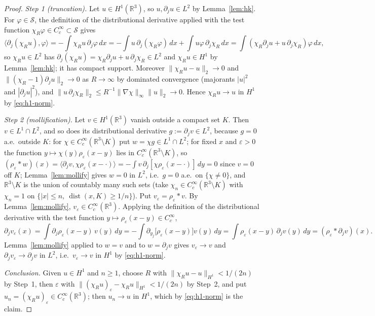 \documentclass[11pt]{article}
\theoremstyle{definition}
\theoremstyle{plain}
\newcommand{\R}{\mathbb R}
\begin{document}
\begin{proof}
\emph{Step 1 (truncation).}  Let $u\in H^1(\R^3)$, so $u,\partial_ju\in L^2$
by Lemma~\ref{lem:hk}.  For $\varphi\in\mathcal S$, the definition of the
distributional derivative applied with the test function
$\chi_R\varphi\in C_c^\infty\subset\mathcal S$ gives
\[
 \langle\partial_j(\chi_Ru),\varphi\rangle=-\int\chi_Ru\,\partial_j\varphi\,dx
 =-\int u\,\partial_j(\chi_R\varphi)\,dx+\int u\varphi\,\partial_j\chi_R\,dx
 =\int(\chi_R\partial_ju+u\,\partial_j\chi_R)\varphi\,dx,
\]
so $\chi_Ru\in L^2$ has $\partial_j(\chi_Ru)=\chi_R\partial_ju+u\,\partial_j\chi_R\in L^2$
and $\chi_Ru\in H^1$ by Lemma~\ref{lem:hk}; it has compact support.
Moreover $\|\chi_Ru-u\|_2\to0$ and $\|(\chi_R-1)\partial_ju\|_2\to0$ as
$R\to\infty$ by dominated convergence (majorants $|u|^2$ and
$|\partial_ju|^2$), and
$\|u\,\partial_j\chi_R\|_2\le R^{-1}\|\nabla\chi\|_\infty\|u\|_2\to0$.
Hence $\chi_Ru\to u$ in $H^1$ by \eqref{eq:h1-norm}.

\emph{Step 2 (mollification).}  Let $v\in H^1(\R^3)$ vanish outside a
compact set $K$.  Then $v\in L^1\cap L^2$, and so does its distributional
derivative $g:=\partial_jv\in L^2$, because $g=0$ a.e.\ outside $K$: for
$\chi\in C_c^\infty(\R^3\setminus K)$ put $w=\chi g\in L^1\cap L^2$; for
fixed $x$ and $\varepsilon>0$ the function $y\mapsto\chi(y)\rho_\varepsilon(x-y)$
lies in $C_c^\infty(\R^3\setminus K)$, so
$(\rho_\varepsilon*w)(x)=\langle\partial_jv,\chi\rho_\varepsilon(x-\cdot)\rangle
=-\int v\,\partial_j[\chi\rho_\varepsilon(x-\cdot)]\,dy=0$ since $v=0$ off
$K$; Lemma~\ref{lem:mollify} gives $w=0$ in $L^2$, i.e.\ $g=0$ a.e.\ on
$\{\chi\ne0\}$, and $\R^3\setminus K$ is the union of countably many such
sets (take $\chi_n\in C_c^\infty(\R^3\setminus K)$ with $\chi_n=1$ on
$\{|x|\le n,\ \operatorname{dist}(x,K)\ge1/n\}$).  Put
$v_\varepsilon=\rho_\varepsilon*v$.  By Lemma~\ref{lem:mollify},
$v_\varepsilon\in C_c^\infty(\R^3)$.  Applying the definition of the
distributional derivative with the test function
$y\mapsto\rho_\varepsilon(x-y)\in C_c^\infty$,
\[
 \partial_jv_\varepsilon(x)
 =\int\partial_j\rho_\varepsilon(x-y)\,v(y)\,dy
 =-\int\partial_{y_j}\bigl[\rho_\varepsilon(x-y)\bigr]v(y)\,dy
 =\int\rho_\varepsilon(x-y)\,\partial_jv(y)\,dy
 =(\rho_\varepsilon*\partial_jv)(x).
\]
Lemma~\ref{lem:mollify} applied to $w=v$ and to $w=\partial_jv$ gives
$v_\varepsilon\to v$ and $\partial_jv_\varepsilon\to\partial_jv$ in $L^2$,
i.e.\ $v_\varepsilon\to v$ in $H^1$ by \eqref{eq:h1-norm}.

\emph{Conclusion.}  Given $u\in H^1$ and $n\ge1$, choose $R$ with
$\|\chi_Ru-u\|_{H^1}<1/(2n)$ by Step~1, then $\varepsilon$ with
$\|(\chi_Ru)_\varepsilon-\chi_Ru\|_{H^1}<1/(2n)$ by Step~2, and put
$u_n=(\chi_Ru)_\varepsilon\in C_c^\infty(\R^3)$; then $u_n\to u$ in $H^1$,
which by \eqref{eq:h1-norm} is the claim.
\end{proof}
\end{document}
